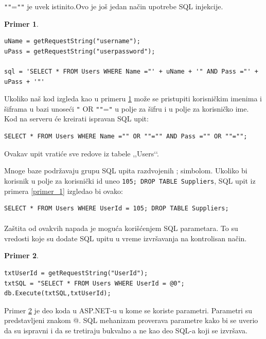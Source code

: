 \documentclass[a4paper]{article}
\theoremstyle{break}
\newtheorem{primer}{Primer}[section]
\begin{document}
{\texttt{"}\texttt{"}=\texttt{"}\texttt{"} je uvek istinito.Ovo je još jedan način upotrebe SQL injekcije.
\begin{primer}
\label{primer_2}
\begin{lstlisting}[frame=single]
uName = getRequestString("username");
uPass = getRequestString("userpassword");

sql = 'SELECT * FROM Users WHERE Name ="' + uName + '" AND Pass ="' + uPass + '"'
\end{lstlisting}
\end{primer}

\noindent Ukoliko naš kod izgleda kao u primeru \ref{primer_2} može se pristupiti korisničkim imenima i šiframa u bazi unoseći \texttt{"} OR \texttt{"}\texttt{"}=\texttt{"} u polje za šifru i u polje za korisničko ime. Kod na serveru će kreirati ispravan SQL upit:

\begin{lstlisting}[frame=single]
SELECT * FROM Users WHERE Name ="" OR ""="" AND Pass ="" OR ""="";
\end{lstlisting}
\noindent Ovakav upit vratiće sve redove iz tabele ,,Users‘‘. 

Mnoge baze podržavaju grupu SQL upita razdvojenih ; simbolom. Ukoliko bi korisnik u polje za korisnički id uneo \texttt{105; DROP TABLE Suppliers}, SQL upit iz primera \ref{primer_1} izgledao bi ovako:

\begin{lstlisting}[frame=single]
SELECT * FROM Users WHERE UserId = 105; DROP TABLE Suppliers; 
\end{lstlisting}
\paragraph{}
Zaštita od ovakvih napada je moguća korišćenjem SQL parametara. To su vredosti koje su dodate SQL upitu u vreme izvršavanja na kontrolisan način.

\begin{primer}
\label{primer_3}
\begin{lstlisting}[frame=single]
txtUserId = getRequestString("UserId");
txtSQL = "SELECT * FROM Users WHERE UserId = @0";
db.Execute(txtSQL,txtUserId);
\end{lstlisting}
\end{primer}
\noindent Primer \ref{primer_3} je deo koda u ASP.NET-u u kome se koriste parametri. Parametri su predstavljeni znakom @. SQL mehanizam proverava parametre kako bi se uverio da su ispravni i da se tretiraju bukvalno a ne kao deo SQL-a koji se izvršava.

}
\end{document}
